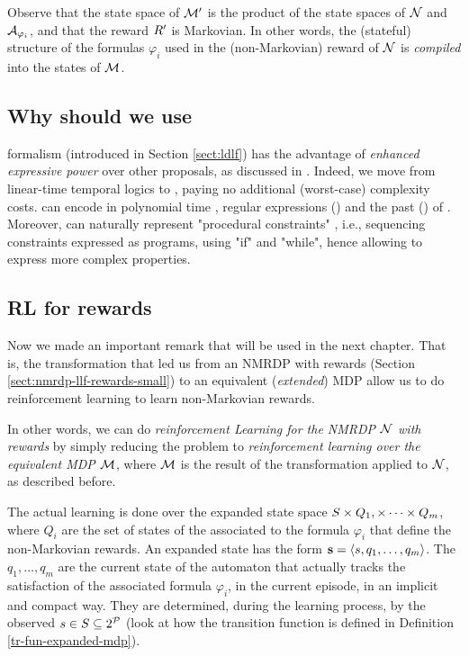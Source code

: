 Observe that the state space of $\mathcal{M}'$ is the product of 
the state spaces of $\mathcal{N}$ and $\mathcal{A}_{\varphi_i}$, and that the reward
$R'$ is Markovian. In other words, the (stateful) structure of
the \LLf formulas $\varphi_i$ used in the 
(non-Markovian) reward of $\mathcal{N}$ is \emph{compiled} into 
the states of $\mathcal{M}$.

\subsection*{Why should we use \LDLf}
\LDLf formalism (introduced in Section \ref{sect:ldlf})  has the advantage of \emph{enhanced expressive power} over other proposals, as discussed in \citep{AAAI1817342}. Indeed, we move from linear-time temporal logics to \LDLf, paying no additional (worst-case) complexity costs. \LDLf can encode in polynomial time \LTLf, regular expressions (\REGEX) and the past \LTL (\PLTL) of \citep{bacchus1996rewarding}.
	Moreover, \LDLf can naturally
	represent "procedural constraints" \citep{Baier:2008:BCP:1620270.1620321}, i.e.,
	sequencing constraints expressed as programs, using "if" and
	"while", hence allowing to express more complex properties.

\subsection{RL for \LLf rewards}
Now we made an important remark that will be used in the next chapter. That is, the transformation that led us from an NMRDP with \LLf rewards (Section \ref{sect:nmrdp-llf-rewards-small}) to an equivalent (\emph{extended}) MDP allow us to do reinforcement learning to learn \LLf non-Markovian rewards. 

In other words, we can do \emph{reinforcement Learning for the NMRDP $\mathcal{N}$ with \LLf rewards} by simply reducing the problem to \emph{reinforcement learning over the equivalent MDP $\mathcal{M}$}, where $\mathcal{M}$ is the result of the transformation applied to $\mathcal{N}$, as described before. 

The actual learning is done over the expanded state space $S \times Q_1, \times \dots \times Q_m$, where $Q_i$ are the set of states of the \DFA associated to the formula $\varphi_i$ that define the non-Markovian rewards. An expanded state has the form $\mathbf{s} = \langle s, q_1, \dots, q_m \rangle$. The $q_1, \dots, q_m$ are the current state of the automaton that actually tracks the satisfaction of the associated formula $\varphi_i$, in the current episode, in an implicit and compact way. They are determined, during the learning process, by the observed $s \in S \subseteq 2^{\mathcal{P}}$ (look at how the transition function is defined in Definition \ref{tr-fun-expanded-mdp}).

